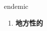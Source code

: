
\begin{frame}
{\huge endemic}
\begin{center}
\begin{enumerate}\Large
  \item \textbf{地方性的}
\end{enumerate}
\end{center}
\end{frame}
